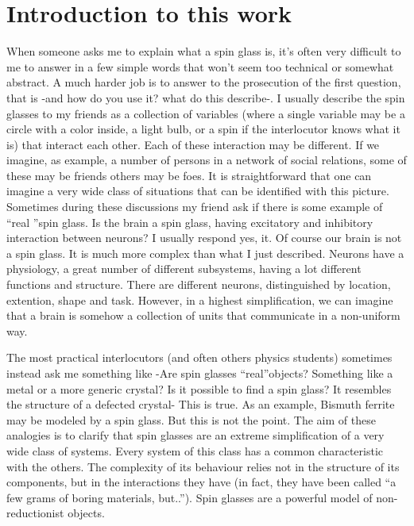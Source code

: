 
\chapter{Introduction to this work}

When someone asks me to explain what a spin glass is, it's often very difficult to me to answer in a few simple words that won't seem too
technical or somewhat abstract. A much harder job is to answer to the prosecution of the first question, that is -and how do you use it? what do this describe-.
I usually describe the spin glasses to my friends as a collection of variables (where a single variable may be a circle with a color inside, a light bulb, or a spin if
the interlocutor knows what it is) that interact each other. Each of these interaction may be different. If we imagine, as example, a number of persons in a network of social relations, some of these may be friends
others may be foes. It is straightforward that one can imagine a very wide class of situations that can be identified with this picture. Sometimes during these discussions my friend ask if there is some example
 of \textquotedblleft real \textquotedblright  spin glass. Is the brain a spin glass, having excitatory and inhibitory interaction between neurons? I usually respond yes, it. Of course our brain is not a spin glass.
It is much more complex than what I just described. Neurons have a physiology, a great number of different subsystems, having a lot different functions and structure. There are different neurons, distinguished by location, extention, shape and task. However, in a highest simplification, we can imagine that a brain is somehow a collection of units that communicate in a non-uniform way.

The most practical interlocutors (and often others physics students) sometimes instead ask me something like -Are spin glasses \textquotedblleft real\textquotedblright objects? Something like a metal or a more generic crystal? Is it possible to find a spin glass? It resembles the structure of a defected crystal- This is true. As an example,
Bismuth ferrite may be modeled by a spin glass. But this is not the point. The aim of these analogies is to clarify that spin glasses are an extreme simplification of a very wide class of systems.
Every system of this class has a common characteristic with the others. The complexity of its behaviour
relies not in the structure of its components, but in the interactions they have (in fact, they have been called \textquotedblleft a few grams of boring materials, but..\textquotedblright). Spin glasses are a powerful model of non-reductionist objects.

